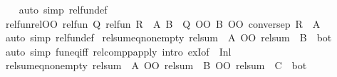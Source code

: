 \begin{isabellebody}
%
\isadelimproof
\ \ %
\endisadelimproof
%
\isatagproof
{}\isamarkupfalse%
\ {\isacharparenleft}{\kern0pt}auto\ simp{\isacharcolon}{\kern0pt}\ rel{\isacharunderscore}{\kern0pt}fun{\isacharunderscore}{\kern0pt}def{\isacharparenright}{\kern0pt}%
\endisatagproof
{\isafoldproof}%
%
\isadelimproof
\isanewline
%
\endisadelimproof
\isanewline
{}\isamarkupfalse%
\ rel{\isacharunderscore}{\kern0pt}fun{\isacharunderscore}{\kern0pt}rel{\isacharunderscore}{\kern0pt}OO{}{\isacharcolon}{\kern0pt}\ {\isachardoublequoteopen}{\isacharparenleft}{\kern0pt}rel{\isacharunderscore}{\kern0pt}fun\ Q\ {\isacharparenleft}{\kern0pt}rel{\isacharunderscore}{\kern0pt}fun\ R\ {\isacharparenleft}{\kern0pt}{\isacharequal}{\kern0pt}{\isacharparenright}{\kern0pt}{\isacharparenright}{\kern0pt}{\isacharparenright}{\kern0pt}\ A\ B\ {\isasymLongrightarrow}\ Q\ OO\ B\ OO\ conversep\ R\ {\isasymle}\ A{\isachardoublequoteclose}\isanewline
%
\isadelimproof
\ \ %
\endisadelimproof
%
\isatagproof
{}\isamarkupfalse%
\ {\isacharparenleft}{\kern0pt}auto\ simp{\isacharcolon}{\kern0pt}\ rel{\isacharunderscore}{\kern0pt}fun{\isacharunderscore}{\kern0pt}def{\isacharparenright}{\kern0pt}%
\endisatagproof
{\isafoldproof}%
%
\isadelimproof
\isanewline
%
\endisadelimproof
\isanewline
{}\isamarkupfalse%
\ rel{\isacharunderscore}{\kern0pt}sum{\isacharunderscore}{\kern0pt}eq{}{\isacharunderscore}{\kern0pt}nonempty{\isacharcolon}{\kern0pt}\ {\isachardoublequoteopen}rel{\isacharunderscore}{\kern0pt}sum\ {\isacharparenleft}{\kern0pt}{\isacharequal}{\kern0pt}{\isacharparenright}{\kern0pt}\ A\ OO\ rel{\isacharunderscore}{\kern0pt}sum\ {\isacharparenleft}{\kern0pt}{\isacharequal}{\kern0pt}{\isacharparenright}{\kern0pt}\ B\ {\isasymnoteq}\ bot{\isachardoublequoteclose}\isanewline
%
\isadelimproof
\ \ %
\endisadelimproof
%
\isatagproof
{}\isamarkupfalse%
\ {\isacharparenleft}{\kern0pt}auto\ simp{\isacharcolon}{\kern0pt}\ fun{\isacharunderscore}{\kern0pt}eq{\isacharunderscore}{\kern0pt}iff\ relcompp{\isacharunderscore}{\kern0pt}apply\ intro{\isacharbang}{\kern0pt}{\isacharcolon}{\kern0pt}\ exI{\isacharbrackleft}{\kern0pt}of\ {\isacharunderscore}{\kern0pt}\ {\isachardoublequoteopen}Inl\ {\isacharunderscore}{\kern0pt}{\isachardoublequoteclose}{\isacharbrackright}{\kern0pt}{\isacharparenright}{\kern0pt}%
\endisatagproof
{\isafoldproof}%
%
\isadelimproof
\isanewline
%
\endisadelimproof
\isanewline
{}\isamarkupfalse%
\ rel{\isacharunderscore}{\kern0pt}sum{\isacharunderscore}{\kern0pt}eq{}{\isacharunderscore}{\kern0pt}nonempty{\isacharcolon}{\kern0pt}\ {\isachardoublequoteopen}rel{\isacharunderscore}{\kern0pt}sum\ {\isacharparenleft}{\kern0pt}{\isacharequal}{\kern0pt}{\isacharparenright}{\kern0pt}\ A\ OO\ {\isacharparenleft}{\kern0pt}rel{\isacharunderscore}{\kern0pt}sum\ {\isacharparenleft}{\kern0pt}{\isacharequal}{\kern0pt}{\isacharparenright}{\kern0pt}\ B\ OO\ rel{\isacharunderscore}{\kern0pt}sum\ {\isacharparenleft}{\kern0pt}{\isacharequal}{\kern0pt}{\isacharparenright}{\kern0pt}\ C{\isacharparenright}{\kern0pt}\ {\isasymnoteq}\ bot{\isachardoublequoteclose}\isanewline

\end{isabellebody}
